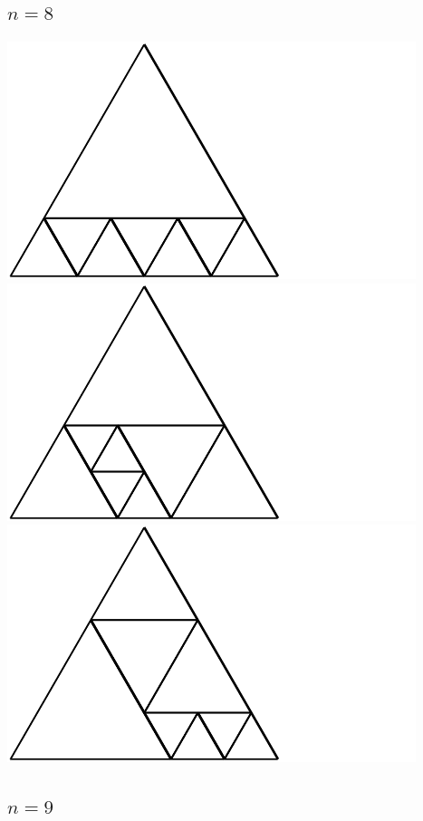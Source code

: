 \documentclass[12pt,amstags,fleqn]{article}
\theoremstyle{plain}
\theoremstyle{definition}
\begin{document}
\subsection*{$n = 8$}

\includegraphics{output-dissections-dissection8_i31_r2_c4.pdf}
\includegraphics{output-dissections-dissection8_i37_r2_c2.pdf}
\includegraphics{output-dissections-dissection8_i37_r2_c4.pdf}

\subsection*{$n = 9$}
\end{document}
